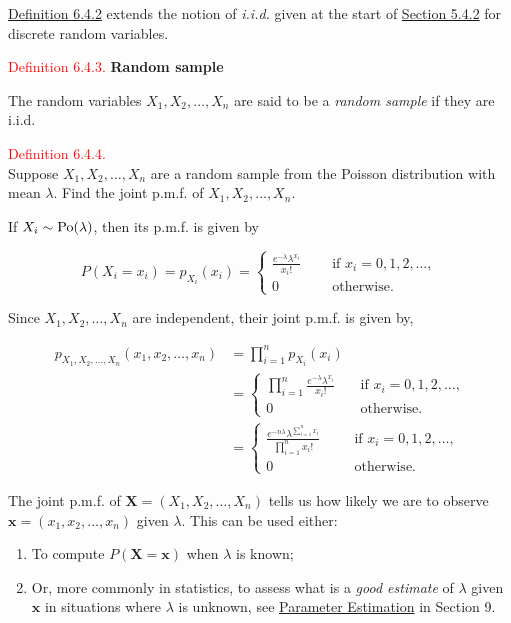 \documentclass[
]{book}
\providecommand{\tightlist}{%
  \setlength{\itemsep}{0pt}\setlength{\parskip}{0pt}}
\begin{document}
\protect\hyperlink{jointdis:def:iid2}{Definition 6.4.2} extends the notion of \emph{i.i.d.} given at the start of \protect\hyperlink{rv:Bernoulli:bin}{Section 5.4.2} for discrete random variables.

\leavevmode{}%
\textcolor{red}{Definition 6.4.3.}
{\textbf{Random sample}}

The random variables \(X_1,X_2,\dots,X_n\) are said to be a \emph{random sample} if they are i.i.d.

\textcolor{red}{Definition 6.4.4.}\\
Suppose \(X_1,X_2,\dots,X_n\) are a random sample from the Poisson distribution with mean \(\lambda\). Find the joint p.m.f. of \(X_1,X_2,\dots,X_n\).

\hfill\break

If \(X_i \sim {\rm Po} (\lambda)\), then its p.m.f. is given by

\[ P(X_i = x_i) = p_{X_i}(x_i) = \begin{cases}
\frac{e^{-\lambda} \lambda^{x_i}}{x_i!} \quad &\text{if $x_i=0,1,2,\dots$}, \\
0 \qquad \quad &\text{otherwise.} \end{cases}\]

Since \(X_1,X_2,\dots,X_n\) are independent, their joint p.m.f. is given by,

\begin{align*}
p_{X_1,X_2,\dots,X_n}(x_1,x_2,\dots,x_n) &= \prod_{i=1}^n p_{X_i}(x_i) \\
&= \begin{cases}
\prod_{i=1}^n \frac{ e^{-\lambda} \lambda^{x_i} } {x_i!} \quad &\text{if $x_i=0,1,2,\dots$,} \\
0 \qquad \qquad \quad &\text{otherwise.} \end{cases} \\
&= \begin{cases}
\frac{ e^{-n\lambda} \lambda^{\sum_{i=1}^n x_i} }{\prod_{i=1}^n x_i!} \quad &\text{if $x_i=0,1,2,\dots$,} \\
0 \qquad \qquad \quad &\text{otherwise.} \end{cases}
\end{align*}

\hfill\break

The joint p.m.f. of \(\mathbf{X} = (X_1,X_2, \ldots, X_n)\) tells us how likely we are to observe \(\mathbf{x}= (x_1,x_2,\ldots, x_n)\) given \(\lambda\). This can be used either:

\begin{enumerate}
\def\labelenumi{\arabic{enumi}.}
\tightlist
\item
  To compute \(P (\mathbf{X} = \mathbf{x})\) when \(\lambda\) is known;\\
\item
  Or, more commonly in statistics, to assess what is a \emph{good estimate} of \(\lambda\) given \(\mathbf{x}\) in situations where \(\lambda\) is unknown, see \protect\hyperlink{paraestimate}{Parameter Estimation} in Section 9.
\end{enumerate}
\end{document}
